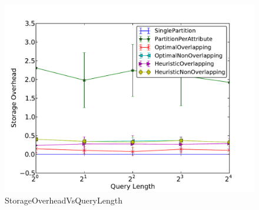 \begin{figure}[ht]
\centerline{\includegraphics[width=0.9\columnwidth]{figures/StorageOverheadVsQueryLength.pdf}}
\caption{StorageOverheadVsQueryLength}
\end{figure}





